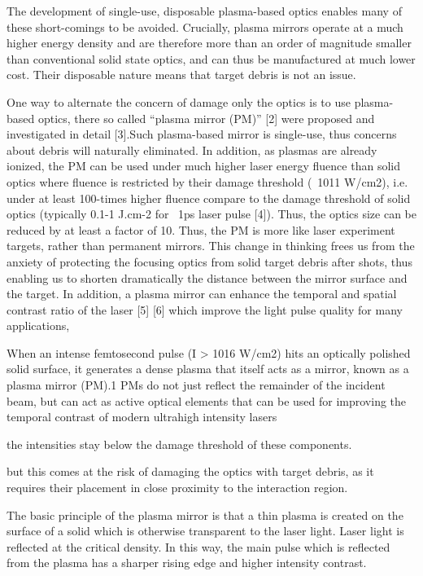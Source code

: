 The development of single-use, disposable plasma-based optics enables many of these short-comings to be avoided. Crucially, plasma mirrors operate at a much higher energy density and are therefore more than an order of magnitude smaller than conventional solid state optics, and can thus be manufactured at much lower cost. Their disposable nature means that target debris is not an issue.


One way to alternate the concern of damage only the optics is to use plasma-based optics, there so called “plasma mirror (PM)” [2] were proposed and investigated in detail [3].Such plasma-based mirror is single-use, thus concerns about debris will naturally eliminated. In addition, as plasmas are already ionized, the PM can be used under much higher laser energy fluence than solid optics where fluence is restricted by their damage threshold (~1011 W/cm2), i.e. under at least 100-times higher fluence compare to the damage threshold of solid optics (typically 0.1-1 J.cm-2 for ~1ps laser pulse [4]). Thus, the optics size can be reduced by at least a factor of 10. Thus, the PM is more like laser experiment targets, rather than permanent mirrors. This change in thinking frees us from the anxiety of protecting the focusing optics from solid target debris after shots, thus enabling us to shorten dramatically the distance between the mirror surface and the target. In addition, a plasma mirror can enhance the temporal and spatial contrast ratio of the laser [5] [6] which improve the light pulse quality for many applications,

When an intense femtosecond pulse (I > 1016 W/cm2) hits an optically polished solid surface, it generates a dense plasma that itself acts as a mirror, known as a plasma mirror (PM).1 PMs do not just reflect the remainder of the incident beam, but can act as active optical elements that can be used for improving the temporal contrast of modern ultrahigh intensity lasers

the intensities stay below the damage threshold of these components.

but this comes at the risk of damaging the optics with target debris, as it requires their placement in close proximity to the interaction region.

The basic principle of the plasma mirror is that a thin plasma is created on the surface of a solid which is otherwise transparent to the laser light. Laser light is reflected at the critical density. In this way, the main pulse which is reflected from the plasma has a sharper rising edge and higher intensity contrast.

